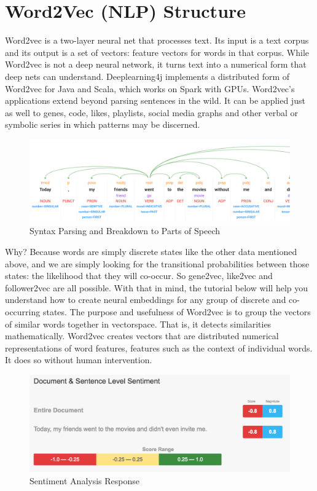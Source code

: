 \pagebreak

\section{Word2Vec (NLP) Structure}

Word2vec is a two-layer neural net that processes text. Its input is a text corpus and its output is a set of vectors: feature vectors for words in that corpus. While Word2vec is not a deep neural network, it turns text into a numerical form that deep nets can understand. Deeplearning4j implements a distributed form of Word2vec for Java and Scala, which works on Spark with GPUs. Word2vec’s applications extend beyond parsing sentences in the wild. It can be applied just as well to genes, code, likes, playlists, social media graphs and other verbal or symbolic series in which patterns may be discerned.

\begin{figure}[H]
    \centering
    \includegraphics[width=\linewidth]{images/syntax-parsing.png}
    \caption{Syntax Parsing and Breakdown to Parts of Speech}
    \label{fig:syntax-parsing}
\end{figure}

Why? Because words are simply discrete states like the other data mentioned above, and we are simply looking for the transitional probabilities between those states: the likelihood that they will co-occur. So gene2vec, like2vec and follower2vec are all possible. With that in mind, the tutorial below will help you understand how to create neural embeddings for any group of discrete and co-occurring states. The purpose and usefulness of Word2vec is to group the vectors of similar words together in vectorspace. That is, it detects similarities mathematically. Word2vec creates vectors that are distributed numerical representations of word features, features such as the context of individual words. It does so without human intervention.

\begin{figure}[H]
    \centering
    \includegraphics[width=\linewidth]{images/sentiment-analysis.png}
    \caption{Sentiment Analysis Response}
    \label{fig:sentiment-analysis}
\end{figure}

